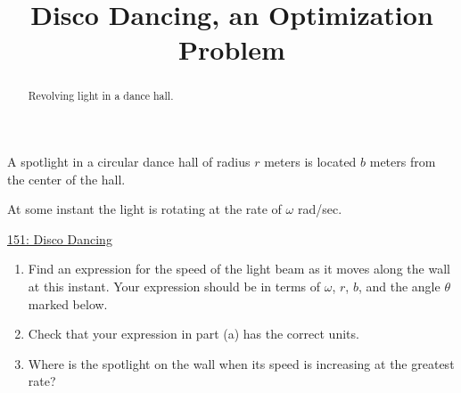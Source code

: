 \documentclass{ximera}
\title{Disco Dancing, an Optimization Problem}
\begin{document}
\begin{abstract}
Revolving light in a dance hall.
\end{abstract}
\maketitle

\begin{question}  \label{QdsadfKGDCCCC}
A spotlight in a circular dance hall of radius $r$ meters is located $b$ meters from the center of the hall. 

At some instant the light is rotating at the rate of $\omega$ rad/sec. 

\begin{onlineOnly}
   \begin{center}
\end{center}
\end{onlineOnly}

\href{https://www.desmos.com/calculator/m2o267u9ur}{151: Disco Dancing}


\begin{enumerate}
\item Find an expression for the speed of the light beam as it moves along the wall at this instant. Your expression should be in terms of $\omega$, $r$, $b$, and the angle $\theta$ marked below.

\item Check that your expression in  part (a) has the correct units.

\item Where is the spotlight on the wall when its speed is increasing at the greatest rate?

\end{enumerate}

\end{question}
\end{document}
